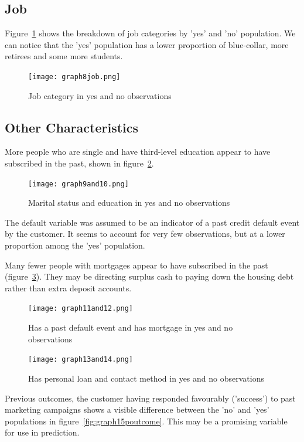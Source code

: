 \documentclass[9pt,technote]{IEEEtran}
\begin{document}
\subsection{Job}

Figure~\ref{fig:graph8job} shows the breakdown of job categories by 'yes' and 'no' population.  We can notice that the 'yes' population has a lower proportion of blue-collar, more retirees and some more students.   

\begin{figure}[htbp]
\centerline{\texttt{[image: graph8job.png]}}
\caption{Job category in yes and no observations}
\label{fig:graph8job}
\end{figure}

\subsection{Other Characteristics}

More people who are single and have third-level education appear to have subscribed in the past, shown in figure~\ref{fig:graph9and10}.  

\begin{figure}[htbp]
\centerline{\texttt{[image: graph9and10.png]}}
\caption{Marital status and education in yes and no observations}
\label{fig:graph9and10}
\end{figure}

The default variable was assumed to be an indicator of a past credit default event by the customer.  It seems to account for very few observations, but at a lower proportion among the 'yes' population.  

Many fewer people with mortgages appear to have subscribed in the past (figure~\ref{fig:graph11and12}).  They may be directing surplus cash to paying down the housing debt rather than extra deposit accounts.  

\begin{figure}[htbp]
\centerline{\texttt{[image: graph11and12.png]}}
\caption{Has a past default event and has mortgage in yes and no observations}
\label{fig:graph11and12}
\end{figure}

\begin{figure}[htbp]
\centerline{\texttt{[image: graph13and14.png]}}
\caption{Has personal loan and contact method in yes and no observations}
\label{fig:graph13and14}
\end{figure}

Previous outcomes, the customer having responded favourably ('success') to past marketing campaigns shows a visible difference between the 'no' and 'yes' populations in figure~\ref{fig:graph15poutcome}.  This may be a promising variable for use in prediction.  
\end{document}
